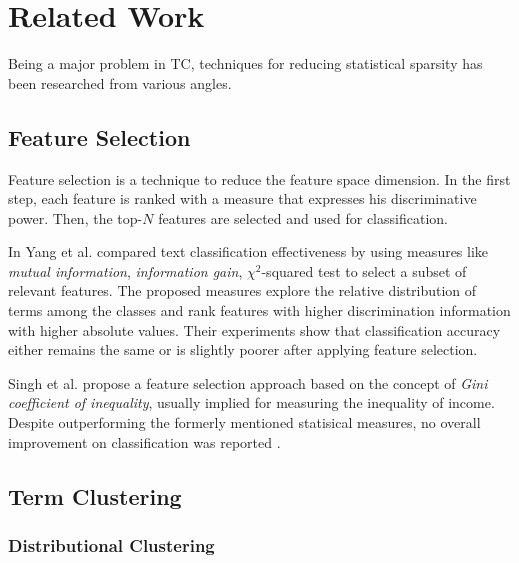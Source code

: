 \chapter{Related Work}

Being a major problem in TC, techniques for reducing statistical sparsity has
been researched from various angles.

\section{Feature Selection}
Feature selection is a technique to reduce the feature space dimension. In the
first step, each feature is ranked with a measure that expresses his
discriminative power. Then, the top-$N$ features are selected and
used for classification. 

In \cite{yang1997comparative} Yang et al.
compared text classification effectiveness by using measures like \emph{mutual information},
\emph{information gain}, $\chi^2$-squared test to select a subset of relevant
features. The proposed measures explore the relative distribution of 
terms among the classes and rank features with higher discrimination information
with higher absolute values. Their experiments show that classification
accuracy either remains the same or is slightly poorer after applying feature selection.

Singh et al. propose a feature selection approach based on the
concept of \emph{Gini coefficient of inequality}, usually implied for measuring the
inequality of income. Despite outperforming the formerly mentioned statisical
measures, no overall improvement on classification was reported
\cite{singh2010feature}. 

\section{Term Clustering}

\subsection{Distributional Clustering}

